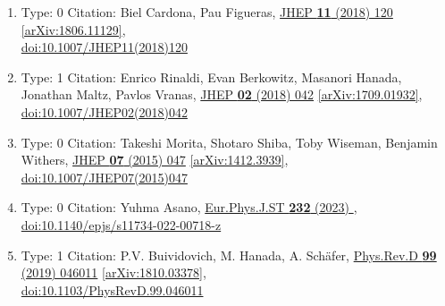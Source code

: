 \documentclass[a4paper,10pt]{article}
\begin{document}
\begin{enumerate}
\begin{enumerate}
  \item Type: 0 Citation: Biel Cardona, Pau Figueras, \href{https://www.doi.org/10.1007/JHEP11(2018)120}{JHEP {\bf 11} (2018) 120}  \href{https://arxiv.org/abs/1806.11129}{[arXiv:1806.11129]},\\\href{https://www.doi.org/10.1007/JHEP11(2018)120}{doi:10.1007/JHEP11(2018)120}
  \item Type: 1 Citation: Enrico Rinaldi, Evan Berkowitz, Masanori Hanada, Jonathan Maltz, Pavlos Vranas, \href{https://www.doi.org/10.1007/JHEP02(2018)042}{JHEP {\bf 02} (2018) 042}  \href{https://arxiv.org/abs/1709.01932}{[arXiv:1709.01932]},\\\href{https://www.doi.org/10.1007/JHEP02(2018)042}{doi:10.1007/JHEP02(2018)042}
  \item Type: 0 Citation: Takeshi Morita, Shotaro Shiba, Toby Wiseman, Benjamin Withers, \href{https://www.doi.org/10.1007/JHEP07(2015)047}{JHEP {\bf 07} (2015) 047}  \href{https://arxiv.org/abs/1412.3939}{[arXiv:1412.3939]},\\\href{https://www.doi.org/10.1007/JHEP07(2015)047}{doi:10.1007/JHEP07(2015)047}
  \item Type: 0 Citation: Yuhma Asano, \href{https://www.doi.org/10.1140/epjs/s11734-022-00718-z}{Eur.Phys.J.ST {\bf 232} (2023) },\\\href{https://www.doi.org/10.1140/epjs/s11734-022-00718-z}{doi:10.1140/epjs/s11734-022-00718-z}
  \item Type: 1 Citation: P.V. Buividovich, M. Hanada, A. Schäfer, \href{https://www.doi.org/10.1103/PhysRevD.99.046011}{Phys.Rev.D {\bf 99} (2019) 046011}  \href{https://arxiv.org/abs/1810.03378}{[arXiv:1810.03378]},\\\href{https://www.doi.org/10.1103/PhysRevD.99.046011}{doi:10.1103/PhysRevD.99.046011}

\end{enumerate}
\end{enumerate}
\end{document}
